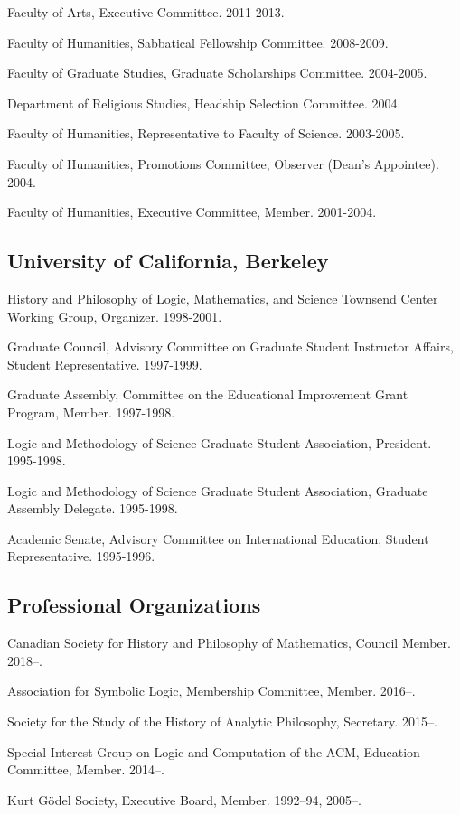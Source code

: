 \documentclass[11pt]{article}
\begin{document}
\ind Faculty of Arts, Executive Committee. 2011-2013.

\ind Faculty of Humanities, Sabbatical Fellowship Committee. 2008-2009.

\ind Faculty of Graduate Studies, Graduate Scholarships Committee. 2004-2005.

\ind Department of Religious Studies, Headship Selection Committee. 2004.

\ind Faculty of Humanities, Representative to Faculty of Science. 2003-2005.

\ind Faculty of Humanities, Promotions Committee, Observer (Dean's Appointee). 2004.

\ind Faculty of Humanities, Executive Committee, Member. 2001-2004.

\subsection{University of California, Berkeley}
\ind History and Philosophy of Logic, Mathematics, and Science Townsend
Center Working Group, Organizer. 1998-2001.

\ind Graduate Council, Advisory Committee on Graduate Student Instructor
Affairs, Student Representative. 1997-1999.

\ind Graduate Assembly, Committee on the Educational Improvement Grant
Program, Member. 1997-1998.

\ind Logic and Methodology of Science Graduate Student Association, President. 1995-1998.

\ind Logic and Methodology of Science Graduate Student Association, Graduate
Assembly Delegate. 1995-1998.

\ind Academic Senate, Advisory Committee on International Education, Student
Representative. 1995-1996.

\subsection{Professional Organizations}
\ind Canadian Society for History and Philosophy of Mathematics, Council
Member. 2018--.

\ind Association for Symbolic Logic, Membership Committee, Member. 2016--.

\ind Society for the Study of the History of Analytic Philosophy, Secretary. 2015--.

\ind Special Interest Group on Logic and Computation of the ACM, Education
Committee, Member. 2014--.

\ind Kurt Gödel Society, Executive Board, Member. 1992--94, 2005--.
\end{document}
